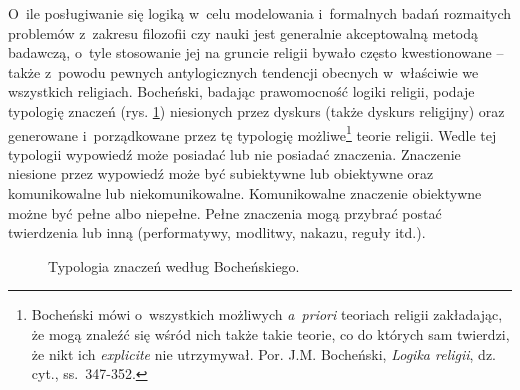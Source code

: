 O~ile posługiwanie się logiką w~celu modelowania i~formalnych badań rozmaitych problemów z~zakresu filozofii czy nauki jest generalnie akceptowalną metodą badawczą, o~tyle stosowanie jej na gruncie religii bywało często kwestionowane -- także z~powodu pewnych antylogicznych tendencji obecnych w~właściwie we wszystkich religiach. Bocheński, badając prawomocność logiki religii, podaje typologię znaczeń (rys. \ref{sil-boch-typ}) niesionych przez dyskurs (także dyskurs religijny) oraz generowane i~porządkowane przez tę typologię możliwe\footnote{Bocheński mówi o~wszystkich możliwych \textit{a~priori} teoriach religii zakładając, że mogą znaleźć się wśród nich także takie teorie, co do których sam twierdzi, że nikt ich \textit{explicite} nie utrzymywał. Por. J.M. Bocheński, \textit{Logika religii}, dz. cyt., ss.~347-352.} teorie religii. Wedle tej typologii wypowiedź może posiadać lub nie posiadać znaczenia. Znaczenie niesione przez wypowiedź może być subiektywne lub obiektywne oraz komunikowalne lub niekomunikowalne. Komunikowalne znaczenie obiektywne możne być pełne albo niepełne. Pełne znaczenia mogą przybrać postać twierdzenia lub inną (performatywy, modlitwy, nakazu, reguły itd.).
\begin{figure}[H]
\begin{center}

\caption[Typologia znaczeń według Bocheńskiego]{Typologia znaczeń według Bocheńskiego\footnotemark.}\label{sil-boch-typ}
\end{center}
\end{figure}


